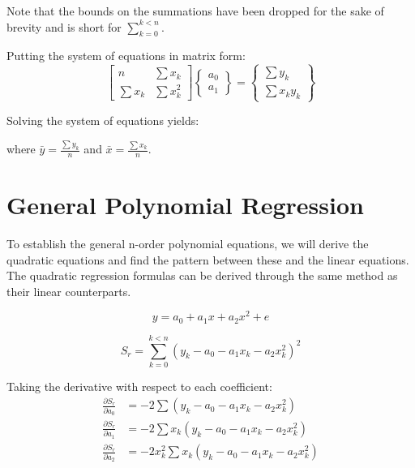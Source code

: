 \documentclass{../../KDHnotes}
\begin{document}
Note that the bounds on the summations have been dropped for the sake of brevity and is short for $\sum_{k=0}^{k<n}$.

Putting the system of equations in matrix form:
\begin{equation}
	\begin{bmatrix}
		n & \sum x_k\\
		\sum x_k & \sum x_k^2
	\end{bmatrix}
	\begin{Bmatrix}
		a_0\\ a_1
	\end{Bmatrix}
	=
	\begin{Bmatrix}
		\sum y_k\\
		\sum x_k y_k
	\end{Bmatrix}
\end{equation}


Solving the system of equations yields:

where $\bar{y}=\frac{\sum y_k}{n}$ and $\bar{x}=\frac{\sum x_k}{n}$.


\section{General Polynomial Regression}

To establish the general n-order polynomial equations, we will derive the quadratic equations and find the pattern between these and the linear equations.
The quadratic regression formulas can be derived through the same method as their linear counterparts.

\begin{equation}
	y = a_0 + a_1x + a_2x^2 + e
\end{equation}

\begin{equation}
	S_r = \sum_{k=0}^{k<n} (y_k - a_0 - a_1x_k - a_2x_k^2)^2
\end{equation}



Taking the derivative with respect to each coefficient:
\begin{align}
	\frac{\partial S_r}{\partial a_0} &= -2 \sum (y_k - a_0 - a_1x_k - a_2 x_k^2)\\
	\frac{\partial S_r}{\partial a_1} &= -2 \sum x_k(y_k - a_0 - a_1x_k - a_2 x_k^2)\\
	\frac{\partial S_r}{\partial a_2} &= -2x_k^2 \sum x_k(y_k - a_0 - a_1x_k - a_2 x_k^2)
\end{align}
\end{document}
